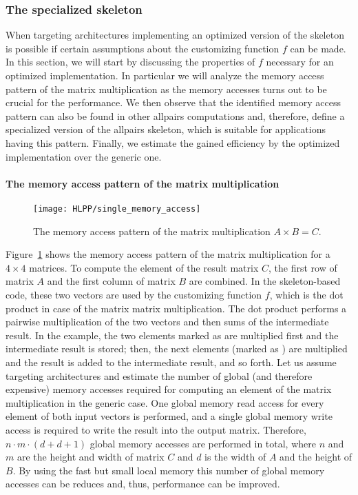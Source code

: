 \subsubsection{The specialized \allpairs skeleton}
\label{sec:opt_allpairs_skeleton}
When targeting \GPU architectures implementing an optimized version of the \allpairs skeleton is possible if certain assumptions about the customizing function $f$ can be made.
In this section, we will start by discussing the properties of $f$ necessary for an optimized \GPU implementation.
In particular we will analyze the memory access pattern of the matrix multiplication as the memory accesses turns out to be crucial for the performance.
We then observe that the identified memory access pattern can also be found in other allpairs computations and, therefore, define a specialized version of the allpairs skeleton, which is suitable for applications having this pattern.
Finally, we estimate the gained efficiency by the optimized implementation over the generic one.


\paragraph{The memory access pattern of the matrix multiplication}
\begin{figure}[t]
  \centering
  \texttt{[image: HLPP/single\_memory\_access]}
  \caption{The memory access pattern of the matrix multiplication $A\times B = C$.}
  \label{fig:mm_access_pattern}
\end{figure}
Figure~\ref{fig:mm_access_pattern} shows the memory access pattern of the matrix multiplication for a $4\times 4$ matrices.
To compute the element  of the result matrix $C$, the first row of matrix $A$ and the first column of matrix $B$ are combined.
In the skeleton-based code, these two vectors are used by the customizing function $f$, which is the dot product in case of the matrix matrix multiplication.
The dot product performs a pairwise multiplication of the two vectors and then sums of the intermediate result.
In the example, the two elements marked as  are multiplied first and the intermediate result is stored;
then, the next elements (marked as ) are multiplied and the result is added to the intermediate result, and so forth.
Let us assume targeting \GPU architectures and estimate the number of global (and therefore expensive) memory accesses required for computing an element of the matrix multiplication in the generic case.
One global memory read access for every element of both input vectors is performed, and a single global memory write access is required to write the result into the output matrix.
Therefore, $n\cdot m\cdot (d + d + 1)$ global memory accesses are performed in total, where $n$ and $m$ are the height and width of matrix $C$ and $d$ is the width of $A$ and the height of $B$.
By using the fast but small local memory this number of global memory accesses can be reduces and, thus, performance can be improved.

